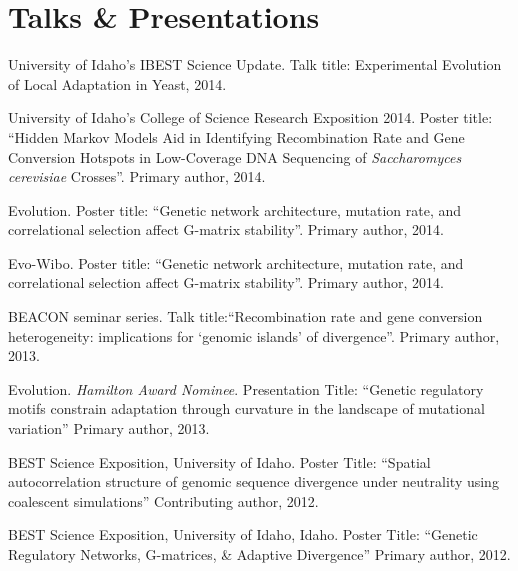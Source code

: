 \documentclass[letterpaper]{article}
\renewenvironment{itemize}{
  \begin{list}{}{
    \setlength{\leftmargin}{1.5em}
  }
}{
  \end{list}
}
\begin{document}



\section*{Talks \& Presentations}

\begin{itemize}
\item University of Idaho's IBEST Science Update. Talk title: Experimental Evolution of Local Adaptation in Yeast, 2014.
\item University of Idaho's College of Science Research Exposition 2014. Poster title: ``Hidden Markov Models Aid in Identifying Recombination Rate and Gene Conversion Hotspots in Low-Coverage DNA Sequencing of \textit{Saccharomyces cerevisiae} Crosses''. Primary author, 2014.
\item Evolution. Poster title: ``Genetic network architecture, mutation rate, and correlational selection affect G-matrix stability''. Primary author, 2014.
\item Evo-Wibo. Poster title: ``Genetic network architecture, mutation rate, and correlational selection affect G-matrix stability''. Primary author, 2014.
\item BEACON seminar series. Talk title:``Recombination rate and gene conversion heterogeneity: implications for `genomic islands' of divergence''. Primary author, 2013.
\item Evolution. \textit{Hamilton Award Nominee}. Presentation Title: ``Genetic regulatory motifs constrain adaptation through curvature in the landscape of mutational variation'' Primary author, 2013.
\item BEST Science Exposition, University of Idaho. Poster Title: ``Spatial autocorrelation structure of genomic sequence divergence under neutrality using coalescent simulations'' Contributing author, 2012.
\item BEST Science Exposition, University of Idaho, Idaho. Poster Title: ``Genetic Regulatory Networks, G-matrices, \& Adaptive Divergence'' Primary author, 2012.

\end{itemize}
\end{document}
